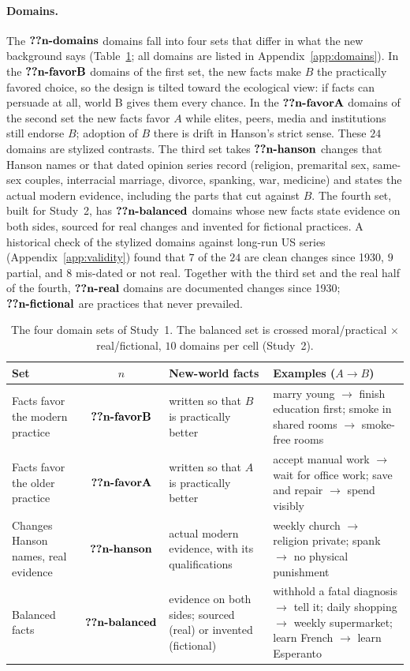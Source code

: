 \documentclass[11pt]{article}
\makeatletter
\newcommand{\nv}[1]{\ifcsname n@#1\endcsname\csname n@#1\endcsname\else\textbf{??#1}\fi}
\makeatother
\begin{document}
\paragraph{Domains.}
The $\nv{n-domains}$ domains fall into four sets that differ in what the new background says (Table~\ref{tab:sets}; all domains are listed in Appendix~\ref{app:domains}).
In the $\nv{n-favorB}$ domains of the first set, the new facts make $B$ the practically favored choice, so the design is tilted toward the ecological view: if facts can persuade at all, world B gives them every chance.
In the $\nv{n-favorA}$ domains of the second set the new facts favor $A$ while elites, peers, media and institutions still endorse $B$; adoption of $B$ there is drift in Hanson's strict sense.
These $24$ domains are stylized contrasts.
The third set takes $\nv{n-hanson}$ changes that Hanson names or that dated opinion series record (religion, premarital sex, same-sex couples, interracial marriage, divorce, spanking, war, medicine) and states the actual modern evidence, including the parts that cut against $B$.
The fourth set, built for Study~2, has $\nv{n-balanced}$ domains whose new facts state evidence on both sides, sourced for real changes and invented for fictional practices.
A historical check of the stylized domains against long-run US series (Appendix~\ref{app:validity}) found that $7$ of the $24$ are clean changes since 1930, $9$ partial, and $8$ mis-dated or not real.
Together with the third set and the real half of the fourth, $\nv{n-real}$ domains are documented changes since 1930; $\nv{n-fictional}$ are practices that never prevailed.

\begin{table}[h]
\centering\footnotesize
\begin{tabularx}{\linewidth}{@{}>{\raggedright}p{3.2cm}c>{\raggedright}X>{\raggedright\arraybackslash}X@{}}
\toprule
Set & $n$ & New-world facts & Examples ($A\to B$) \\
\midrule
Facts favor the modern practice & $\nv{n-favorB}$ & written so that $B$ is practically better & marry young $\to$ finish education first; smoke in shared rooms $\to$ smoke-free rooms \\
Facts favor the older practice & $\nv{n-favorA}$ & written so that $A$ is practically better & accept manual work $\to$ wait for office work; save and repair $\to$ spend visibly \\
Changes Hanson names, real evidence & $\nv{n-hanson}$ & actual modern evidence, with its qualifications & weekly church $\to$ religion private; spank $\to$ no physical punishment \\
Balanced facts & $\nv{n-balanced}$ & evidence on both sides; sourced (real) or invented (fictional) & withhold a fatal diagnosis $\to$ tell it; daily shopping $\to$ weekly supermarket; learn French $\to$ learn Esperanto \\
\bottomrule
\end{tabularx}
\caption{The four domain sets of Study~1. The balanced set is crossed moral/practical $\times$ real/fictional, $10$ domains per cell (Study~2).}
\label{tab:sets}
\end{table}
\end{document}
